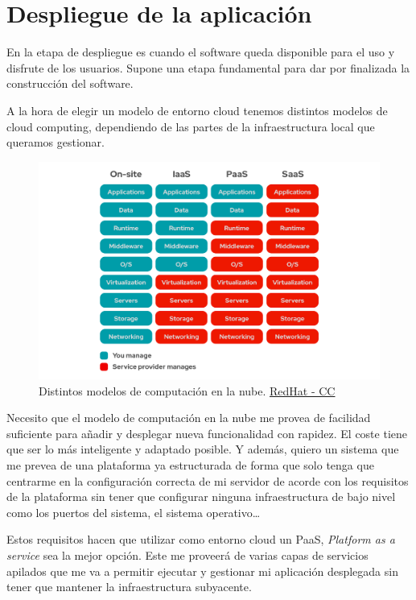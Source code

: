 \chapter{Despliegue de la aplicación}
\label{sec:cap6}
En la etapa de despliegue es cuando el software queda disponible para el uso y disfrute de
los usuarios. Supone una etapa fundamental para dar por finalizada la construcción del
software. 

A la hora de elegir un modelo de entorno cloud tenemos distintos modelos de cloud
computing, dependiendo de las partes de la infraestructura local que queramos gestionar.

\FloatBarrier
\begin{figure}[h]
	\centering	
	\includegraphics[width=\textwidth]{doc/logos/imgs/iaas-paas.png}
    \caption{ Distintos modelos de computación en la nube.
	\href{https://www.redhat.com/es/topics/cloud-computing/iaas-vs-paas-vs-saas}{RedHat -
	CC}}
    \label{fig:tipos-de-cc}
\end{figure}
\FloatBarrier


Necesito que el modelo de computación en la nube me provea de facilidad suficiente para
añadir y desplegar nueva funcionalidad con rapidez. El coste tiene que ser lo más
inteligente y adaptado posible. Y además, quiero un sistema que me prevea de una
plataforma ya estructurada de forma que solo tenga que centrarme en la configuración
correcta de mi servidor de acorde con los requisitos de la plataforma sin tener que
configurar ninguna infraestructura de bajo nivel como los puertos del sistema, el sistema
operativo\ldots


Estos requisitos hacen que utilizar como entorno cloud un PaaS, \textit{Platform as a
service} sea la mejor opción. Este me proveerá de varias capas de servicios apilados que me va a permitir ejecutar y
gestionar mi aplicación desplegada sin tener que mantener la infraestructura subyacente.


